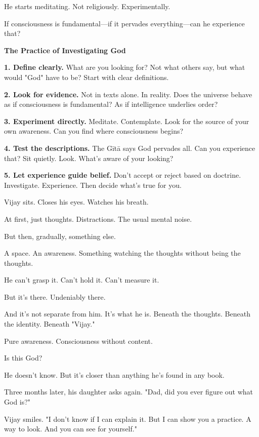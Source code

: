 \documentclass[11pt,twoside]{book}
\begin{document}
He starts meditating. Not religiously. Experimentally.

If consciousness is fundamental—if it pervades everything—can he experience that?

\begin{practicebox}
\textbf{The Practice of Investigating God}

\textbf{1. Define clearly.} What are you looking for? Not what others say, but what would "God" have to be? Start with clear definitions.

\textbf{2. Look for evidence.} Not in texts alone. In reality. Does the universe behave as if consciousness is fundamental? As if intelligence underlies order?

\textbf{3. Experiment directly.} Meditate. Contemplate. Look for the source of your own awareness. Can you find where consciousness begins?

\textbf{4. Test the descriptions.} The Gītā says God pervades all. Can you experience that? Sit quietly. Look. What's aware of your looking?

\textbf{5. Let experience guide belief.} Don't accept or reject based on doctrine. Investigate. Experience. Then decide what's true for you.
\end{practicebox}

Vijay sits. Closes his eyes. Watches his breath.

At first, just thoughts. Distractions. The usual mental noise.

But then, gradually, something else.

A space. An awareness. Something watching the thoughts without being the thoughts.

He can't grasp it. Can't hold it. Can't measure it.

But it's there. Undeniably there.

And it's not separate from him. It's what he is. Beneath the thoughts. Beneath the identity. Beneath "Vijay."

Pure awareness. Consciousness without content.

Is this God?

He doesn't know. But it's closer than anything he's found in any book.

Three months later, his daughter asks again. "Dad, did you ever figure out what God is?"

Vijay smiles. "I don't know if I can explain it. But I can show you a practice. A way to look. And you can see for yourself."
\end{document}
